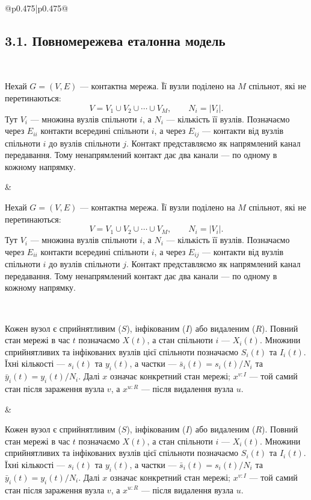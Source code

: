 ﻿\documentclass[11pt]{article}
\newcommand{\ibar}{\bar{y}}
\newcommand{\sbar}{\bar{s}}
\begin{document}
\begin{longtable}{@{}p{0.475\textwidth}|p{0.475\textwidth}@{}}
\begin{minipage}[t]{\linewidth}
\subsection*{3.1. Повномережева еталонна модель}
\end{minipage} \\[5mm]
\begin{minipage}[t]{\linewidth}
Нехай $G=(V,E)$ --- контактна мережа. Її вузли поділено на $M$ спільнот, які не перетинаються:
\begin{equation*}V=V_1\cup V_2\cup\cdots\cup V_M,
\qquad N_i=|V_i|.\tag{1}
\end{equation*}
Тут $V_i$ --- множина вузлів спільноти $i$, а $N_i$ --- кількість її вузлів. Позначаємо через $E_{ii}$ контакти всередині спільноти $i$, а через $E_{ij}$ --- контакти від вузлів спільноти $i$ до вузлів спільноти $j$. Контакт представляємо як напрямлений канал передавання. Тому ненапрямлений контакт дає два канали --- по одному в кожному напрямку.
\end{minipage} &
\begin{minipage}[t]{\linewidth}
Нехай $G=(V,E)$ --- контактна мережа. Її вузли поділено на $M$ спільнот, які не перетинаються:
\begin{equation*}V=V_1\cup V_2\cup\cdots\cup V_M,
\qquad N_i=|V_i|.\tag{1}
\end{equation*}
Тут $V_i$ --- множина вузлів спільноти $i$, а $N_i$ --- кількість її вузлів. Позначаємо через $E_{ii}$ контакти всередині спільноти $i$, а через $E_{ij}$ --- контакти від вузлів спільноти $i$ до вузлів спільноти $j$. Контакт представляємо як напрямлений канал передавання. Тому ненапрямлений контакт дає два канали --- по одному в кожному напрямку.
\end{minipage} \\[5mm]
\begin{minipage}[t]{\linewidth}
Кожен вузол є сприйнятливим ($S$), інфікованим ($I$) або видаленим ($R$). Повний стан мережі в час $t$ позначаємо $X(t)$, а стан спільноти $i$ --- $X_i(t)$. Множини сприйнятливих та інфікованих вузлів цієї спільноти позначаємо $S_i(t)$ та $I_i(t)$. Їхні кількості --- $s_i(t)$ та $y_i(t)$, а частки --- $\sbar_i(t)=s_i(t)/N_i$ та $\ibar_i(t)=y_i(t)/N_i$. Далі $x$ означає конкретний стан мережі; $x^{v:I}$ --- той самий стан після зараження вузла $v$, а $x^{u:R}$ --- після видалення вузла $u$.
\end{minipage} &
\begin{minipage}[t]{\linewidth}
Кожен вузол є сприйнятливим ($S$), інфікованим ($I$) або видаленим ($R$). Повний стан мережі в час $t$ позначаємо $X(t)$, а стан спільноти $i$ --- $X_i(t)$. Множини сприйнятливих та інфікованих вузлів цієї спільноти позначаємо $S_i(t)$ та $I_i(t)$. Їхні кількості --- $s_i(t)$ та $y_i(t)$, а частки --- $\sbar_i(t)=s_i(t)/N_i$ та $\ibar_i(t)=y_i(t)/N_i$. Далі $x$ означає конкретний стан мережі; $x^{v:I}$ --- той самий стан після зараження вузла $v$, а $x^{u:R}$ --- після видалення вузла $u$.

\end{minipage}
\end{longtable}
\end{document}
